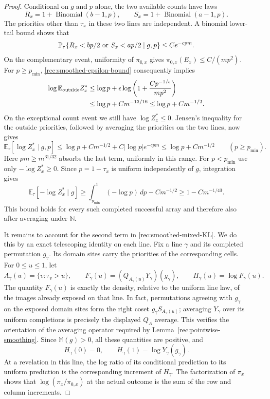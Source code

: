 \begin{proof}
Conditional on $g$ and $p$ alone, the two available counts have
laws
\[
 R_x=1+\operatorname{Binomial}(b-1,p),\qquad
 S_x=1+\operatorname{Binomial}(a-1,p).
\]
The priorities other than $\tau_x$ in these two lines are
independent. A binomial lower-tail bound shows that
\[
 \mathbb P_\tau\{R_x<bp/2\ \hbox{or}\ S_x<ap/2\mid g,p\}
                                        \le C e^{-cpm}.
\]
On the complementary event, uniformity of $\pi_{0,x}$ gives
$\pi_{0,x}(E_x)\le C/(mp^2)$. For $p\ge p_{\min}$,
\eqref{rec:smoothed-epsilon-bound} consequently implies
\begin{align*}
 \log\mathbb E_{\rm outside}Z_x^*
 &\le\log p+
       \epsilon\log\left(1+\frac{C p^{-1/\epsilon}}{mp^2}\right)\\
 &\le\log p+C m^{-13/16}
 \le\log p+C m^{-1/2}.
\end{align*}
On the exceptional count event we still have $\log Z_x^*\le0$.
Jensen's inequality for the outside priorities, followed by
averaging the priorities on the two lines, now gives
\[
 \mathbb E_\tau[\log Z_x^*\mid g,p]
 \le\log p+C m^{-1/2}+C|\log p|e^{-cpm}
 \le\log p+C m^{-1/2}
                    \qquad(p\ge p_{\min}).
\]
Here $pm\ge m^{31/32}$ absorbs the last term, uniformly in this
range. For $p<p_{\min}$ use only $-\log Z_x^*\ge0$. Since
$p=1-\tau_x$ is uniform independently of $g$, integration gives
\begin{equation}\label{rec:smoothed-slot-saving}
 \mathbb E_\tau[-\log Z_x^*\mid g]
 \ge\int_{p_{\min}}^1(-\log p)\,dp-Cm^{-1/2}
 \ge1-Cm^{-1/40}.
\end{equation}
This bound holds for every such completed successful array and
therefore also after averaging under $\mathbb N$.

It remains to account for the second term in
\eqref{rec:smoothed-mixed-KL}. We do this by an exact telescoping
identity on each line. Fix a line $\gamma$ and its completed
permutation $g_\gamma$. Its domain sites carry the priorities of
the corresponding cells. For $0\le u\le1$, let
\[
 A_\gamma(u)=\{v:\tau_v>u\},
 \qquad
 F_\gamma(u)=
       (Q_{A_\gamma(u)}Y_\gamma)(g_\gamma),
 \qquad H_\gamma(u)=\log F_\gamma(u).
\]
The quantity $F_\gamma(u)$ is exactly the density, relative to
the uniform line law, of the images already exposed on that line.
In fact, permutations agreeing with $g_\gamma$ on the exposed
domain sites form the right coset $g_\gamma S_{A_\gamma(u)}$;
averaging $Y_\gamma$ over its uniform completions is precisely
the displayed $Q_A$ average. This verifies the orientation of
the averaging operator required by
Lemma~\ref{rec:pointwise-smoothing}. Since
$\mathbb M(g)>0$, all these quantities are positive, and
\[
 H_\gamma(0)=0,
 \qquad H_\gamma(1)=\log Y_\gamma(g_\gamma).
\]
At a revelation in this line, the log ratio of its conditional
prediction to its uniform prediction is the corresponding
increment of $H_\gamma$. The factorization of $\pi_x$ shows
that $\log(\pi_x/\pi_{0,x})$ at the actual outcome is the sum
of the row and column increments.


\end{proof}
